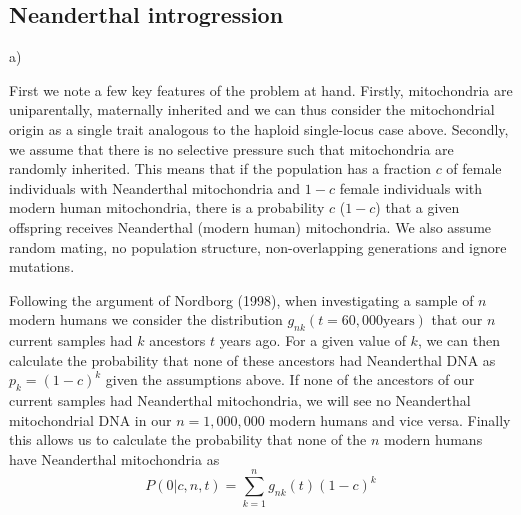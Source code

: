 \documentclass{article}
\begin{document}
\newpage

\subsection{Neanderthal introgression}


a) %

First we note a few key features of the problem at hand. Firstly, mitochondria are uniparentally, maternally inherited and we can thus consider the mitochondrial origin as a single trait analogous to the haploid single-locus case above. Secondly, we assume that there is no selective pressure such that mitochondria are randomly inherited. This means that if the population has a fraction $c$ of female individuals with Neanderthal mitochondria and $1-c$ female individuals with modern human mitochondria, there is a probability $c$  ($1-c$) that a given offspring receives Neanderthal (modern human) mitochondria. We also assume random mating, no population structure, non-overlapping generations and ignore mutations.

Following the argument of Nordborg (1998), when investigating a sample of $n$ modern humans we consider the distribution $g_{nk}(t=60,000 \text{years})$ that our $n$ current samples had $k$ ancestors $t$ years ago. For a given value of $k$, we can then calculate the probability that none of these ancestors had Neanderthal DNA as $p_k = (1-c)^k$ given the assumptions above. If none of the ancestors of our current samples had Neanderthal mitochondria, we will see no Neanderthal mitochondrial DNA in our $n=1,000,000$ modern humans and vice versa. Finally this allows us to calculate the probability that none of the $n$ modern humans have Neanderthal mitochondria as 
\begin{equation}\label{eq:prob}
P(0 | c, n, t) = \sum_{k=1}^{n}{g_{nk}(t)(1-c)^k}
\end{equation}
\end{document}
